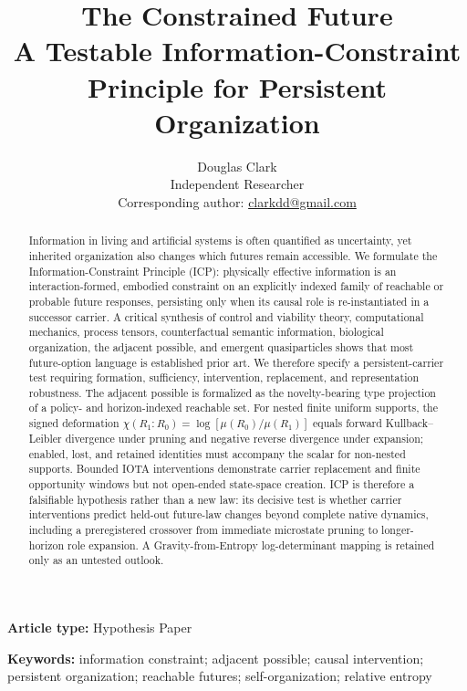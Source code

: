 \documentclass[11pt]{article}
\title{\textbf{The Constrained Future}\\
\large A Testable Information-Constraint Principle for Persistent Organization}
\author{Douglas Clark\\
\small Independent Researcher\\
\small Corresponding author: \href{mailto:clarkdd@gmail.com}{clarkdd@gmail.com}}
\date{}
\begin{document}
\maketitle

\noindent\textbf{Article type:} Hypothesis Paper

\begin{abstract}
Information in living and artificial systems is often quantified as uncertainty,
yet inherited organization also changes which futures remain accessible. We
formulate the Information-Constraint Principle (ICP): physically effective
information is an interaction-formed, embodied constraint on an explicitly
indexed family of reachable or probable future responses, persisting only when
its causal role is re-instantiated in a successor carrier. A critical synthesis
of control and viability theory, computational mechanics, process tensors,
counterfactual semantic information, biological organization, the adjacent
possible, and emergent quasiparticles shows that most future-option language is
established prior art. We therefore specify a persistent-carrier test requiring
formation, sufficiency, intervention, replacement, and representation
robustness. The adjacent possible is formalized as the novelty-bearing type
projection of a policy- and horizon-indexed reachable set. For nested finite
uniform supports, the signed deformation
$\chi(R_1\!:\!R_0)=\log[\mu(R_0)/\mu(R_1)]$ equals forward Kullback--Leibler
divergence under pruning and negative reverse divergence under expansion;
enabled, lost, and retained identities must accompany the scalar for non-nested
supports. Bounded IOTA interventions demonstrate carrier replacement and finite
opportunity windows but not open-ended state-space creation. ICP is therefore a
falsifiable hypothesis rather than a new law: its decisive test is whether
carrier interventions predict held-out future-law changes beyond complete
native dynamics, including a preregistered crossover from immediate microstate
pruning to longer-horizon role expansion. A Gravity-from-Entropy
log-determinant mapping is retained only as an untested outlook.
\end{abstract}

\noindent\textbf{Keywords:} information constraint; adjacent possible; causal
intervention; persistent organization; reachable futures; self-organization;
relative entropy

\linenumbers









\end{document}
